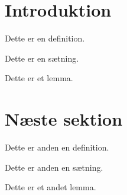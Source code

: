 
\section{Introduktion}

\begin{defn}
Dette er en definition.
\end{defn}

\begin{thm}
Dette er en sætning.
\end{thm}

\begin{lemma}
Dette er et lemma.
\end{lemma}

\section{Næste sektion}

\begin{defn}
Dette er anden en definition.
\end{defn}

\begin{thm}
Dette er anden en sætning.
\end{thm}

\begin{lemma}
Dette er et andet lemma.
\end{lemma}

